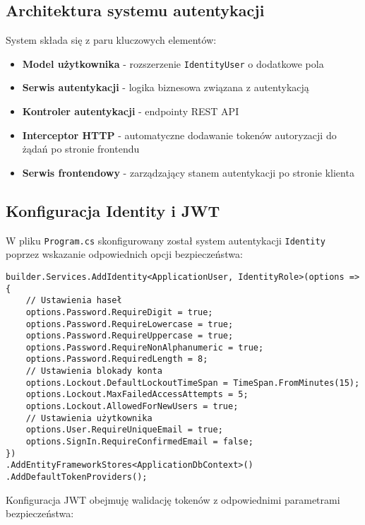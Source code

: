 \subsection{Architektura systemu autentykacji}
System składa się z paru kluczowych elementów:
\begin{itemize}
	\item \textbf{Model użytkownika} - rozszerzenie \texttt{IdentityUser} o dodatkowe pola
	\item \textbf{Serwis autentykacji} - logika biznesowa związana z autentykacją
	\item \textbf{Kontroler autentykacji} - endpointy REST API
	\item \textbf{Interceptor HTTP} - automatyczne dodawanie tokenów autoryzacji do żądań po stronie frontendu
	\item \textbf{Serwis frontendowy} - zarządzający stanem autentykacji po stronie klienta
\end{itemize}

\subsection{Konfiguracja Identity i JWT}
W pliku \texttt{Program.cs} skonfigurowany został system autentykacji \texttt{Identity} poprzez wskazanie odpowiednich opcji bezpieczeństwa:

\begin{lstlisting}[style=csharp, caption={Konfiguracja bezpieczeństwa w Program.cs}]
builder.Services.AddIdentity<ApplicationUser, IdentityRole>(options =>
{
	// Ustawienia haseł
	options.Password.RequireDigit = true;
	options.Password.RequireLowercase = true;
	options.Password.RequireUppercase = true;
	options.Password.RequireNonAlphanumeric = true;
	options.Password.RequiredLength = 8;
	// Ustawienia blokady konta
	options.Lockout.DefaultLockoutTimeSpan = TimeSpan.FromMinutes(15);
	options.Lockout.MaxFailedAccessAttempts = 5;
	options.Lockout.AllowedForNewUsers = true;
	// Ustawienia użytkownika
	options.User.RequireUniqueEmail = true;
	options.SignIn.RequireConfirmedEmail = false;
})
.AddEntityFrameworkStores<ApplicationDbContext>()
.AddDefaultTokenProviders();
\end{lstlisting}

Konfiguracja JWT obejmuję walidację tokenów z odpowiednimi parametrami bezpieczeństwa:

